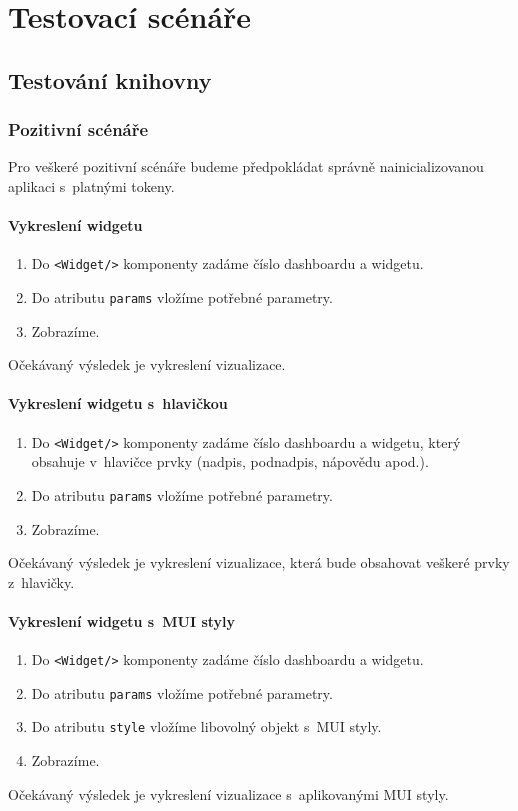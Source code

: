 \documentclass[czech, bc, kiv, he, iso690numb, viewonly]{fasthesis} %
\begin{document}
\chapter{Testovací scénáře}\label{app:testCases}
\section{Testování knihovny}
\subsection{Pozitivní scénáře}
Pro veškeré pozitivní scénáře budeme předpokládat správně nainicializovanou aplikaci s~platnými tokeny.
\subsubsection{Vykreslení widgetu}
\begin{enumerate}
	\item Do \texttt{<Widget/>} komponenty zadáme číslo dashboardu a widgetu.
	\item Do atributu \texttt{params} vložíme potřebné parametry.
	\item Zobrazíme.
\end{enumerate}
Očekávaný výsledek je vykreslení vizualizace.

\subsubsection{Vykreslení widgetu s~hlavičkou}
\begin{enumerate}
	\item Do \texttt{<Widget/>} komponenty zadáme číslo dashboardu a widgetu, který obsahuje v~hlavičce prvky (nadpis, podnadpis, nápovědu apod.).
	\item Do atributu \texttt{params} vložíme potřebné parametry.
	\item Zobrazíme.
\end{enumerate}
Očekávaný výsledek je vykreslení vizualizace, která bude obsahovat veškeré prvky z~hlavičky.

\subsubsection{Vykreslení widgetu s~MUI styly}
\begin{enumerate}
	\item Do \texttt{<Widget/>} komponenty zadáme číslo dashboardu a widgetu.
	\item Do atributu \texttt{params} vložíme potřebné parametry.
	\item Do atributu \texttt{style} vložíme libovolný objekt s~MUI styly.
	\item Zobrazíme.
\end{enumerate}
Očekávaný výsledek je vykreslení vizualizace s~aplikovanými MUI styly.
\end{document}
